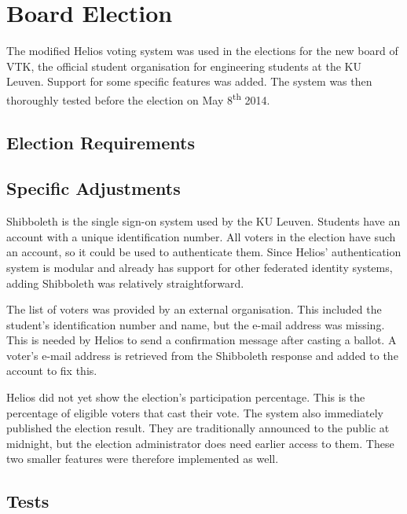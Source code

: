 % 
%

\section{Board Election}
\label{sec:board_election}

The modified Helios voting system was used in the elections for the new board of VTK, the official student organisation for engineering students at the KU Leuven. Support for some specific features was added. The system was then thoroughly tested before the election on May 8\textsuperscript{th} 2014.

\subsection{Election Requirements}


\subsection{Specific Adjustments}

Shibboleth is the single sign-on system used by the KU Leuven. Students have an account with a unique identification number. All voters in the election have such an account, so it could be used to authenticate them. Since Helios' authentication system is modular and already has support for other federated identity systems, adding Shibboleth was relatively straightforward.

\par The list of voters was provided by an external organisation. This included the student's identification number and name, but the e-mail address was missing. This is needed by Helios to send a confirmation message after casting a ballot. A voter's e-mail address is retrieved from the Shibboleth response and added to the account to fix this.

\par Helios did not yet show the election's participation percentage. This is the percentage of eligible voters that cast their vote. The system also immediately published the election result. They are traditionally announced to the public at midnight, but the election administrator does need earlier access to them. These two smaller features were therefore implemented as well.

\subsection{Tests}

